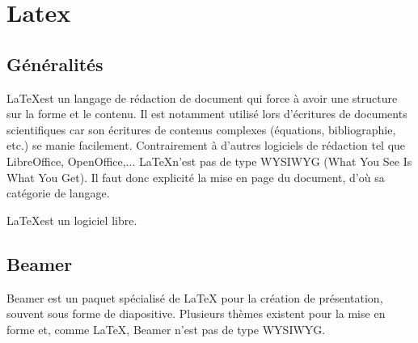 \section{Latex}

\subsection{Généralités}
\LaTeX est un langage de rédaction de document qui force à avoir une structure sur la forme et le contenu. Il est notamment utilisé lors d'écritures de documents scientifiques car son écritures de contenus complexes (équations, bibliographie, etc.) se manie facilement.
Contrairement à d'autres logiciels de rédaction tel que LibreOffice, OpenOffice,... \LaTeX n'est pas de type WYSIWYG (What You See Is What You Get). Il faut donc explicité la mise en page du document, d'où sa catégorie de langage.

\LaTeX est un logiciel libre.

\subsection{Beamer}
Beamer est un paquet spécialisé de LaTeX pour la création de présentation, souvent sous forme de diapositive. Plusieurs thèmes existent pour la mise en forme et, comme \LaTeX, Beamer n'est pas de type WYSIWYG.

